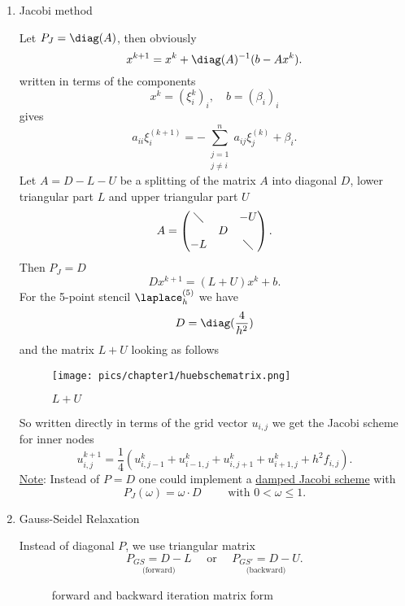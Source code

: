 \begin{enumerate}[label=\Alph{enumi})]
	\item Jacobi method 

		Let $P_{J} = \diag(A)$, then obviously
		\[
			x^{k+1} = x^{k} + \diag(A)^{-1}(b-Ax^{k})
		.\] 
		written in terms of the components
		\[
			x^{k}= (\xi _{i}^{k})_{i}, \quad b=(\beta_{i})_{i}
		\] 
		gives
		\[
			a_{ii}\xi _{i}^{(k+1)} = -\sum_{\substack{j=1 \\ j \neq i}}^{n}{a_{ij}\xi _{j}^{(k)}+ \beta_{i}}
		.\] 
		Let $A=D-L-U$ be a splitting of the matrix $A$ into diagonal $D$, lower triangular part $L$ and upper triangular part $U$
		\[
		A = \begin{pmatrix}
			\diagdown & & -U \\
			  &D&    \\
			-L & & \diagdown
		\end{pmatrix}
		.\] 
		Then $P_{J} = D$
		\[
			Dx^{k+1} = (L+U)x^{k} + b
		.\] 
		For the 5-point stencil $\laplace_{h}^{(5)}$ we have 
		\[
			D = \diag(\frac{4}{h^{2}}) 		
		\] 
		and the matrix $L+U$ looking as follows
		\begin{figure}[H]
			\begin{center}
				\texttt{[image: pics/chapter1/huebschematrix.png]}
			\end{center}
			\caption{$L+U$}
			\label{fig:huebschematrix}
		\end{figure}
		
		So written directly in terms of the grid vector $u_{i,j}$ we get the Jacobi scheme for inner nodes
		\[
			u_{i,j}^{k+1} = \frac{1}{4}(u_{i,j-1}^{k}+ u_{i-1,j}^{k} + u_{i,j+1}^{k} + u_{i+1,j}^{k} + h^{2}f_{i,j})
		.\] 
		\underline{Note}: Instead of $P=D$ one could implement a \underline{damped Jacobi scheme} with
		\[
			P_{J}(\omega )=\omega \cdot D \qquad \text{ with } 0 < \omega \leq 1
		.\] 
	\item Gauss-Seidel Relaxation

		Instead of diagonal $P$, we use triangular matrix
		\[
			\underset{\text{ (forward) }}{P_{GS} = D-L} \quad\text{ or }\quad \underset{\text{ (backward) }}{P_{GS'}=D-U}
		.\] 
		\begin{figure}[H]
			\begin{center}
				
			\end{center}
			\caption{forward and backward iteration matrix form}
			\label{fig:forwardbackward}
		\end{figure}
		

\end{enumerate}
